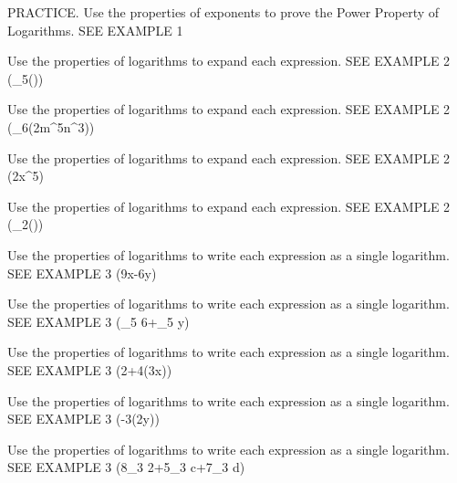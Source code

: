 \documentclass{article}
\newenvironment{practice}[2]{}{}        %
\newcommand{\answer}[1]{}               %
\begin{document}
\begin{practice}{13}{3}
PRACTICE. Use the properties of exponents to prove the Power Property of Logarithms. SEE EXAMPLE 1
\answer{Let (\log_b(m^n)=x).
(b^x=m^n)
((b^x)^{\frac{1}{n}}=(m^n)^{\frac{1}{n}})
(b^{\frac{x}{n}}=m)
(\frac{x}{n}=\log_b m)
(x=n\log_b m)
(\log_b(m^n)=n\log_b(m))}
\end{practice}
\begin{practice}{14}{1}
Use the properties of logarithms to expand each expression. SEE EXAMPLE 2
(\log_5())
\answer{(\log_5 2-\log_5 3)}
\end{practice}
\begin{practice}{15}{1}
Use the properties of logarithms to expand each expression. SEE EXAMPLE 2
(\log_6(2m^5n^3))
\answer{(\log_6 2+5\log_6 m+3\log_6 n)}
\end{practice}
\begin{practice}{16}{1}
Use the properties of logarithms to expand each expression. SEE EXAMPLE 2
(\ln2x^5)
\answer{(\ln2+5\ln x)}
\end{practice}
\begin{practice}{17}{1}
Use the properties of logarithms to expand each expression. SEE EXAMPLE 2
(\log_2())
\answer{(\log_2 x-\log_2 5-\log_2 y)}
\end{practice}
\begin{practice}{18}{1}
Use the properties of logarithms to write each expression as a single logarithm. SEE EXAMPLE 3
(9\ln x-6\ln y)
\answer{(\ln(\frac{x^9}{y^6}))}
\end{practice}
\begin{practice}{19}{1}
Use the properties of logarithms to write each expression as a single logarithm. SEE EXAMPLE 3
(\log_5 6+\log_5 y)
\answer{(\log_5(6y^{\frac{1}{2}}))}
\end{practice}
\begin{practice}{20}{1}
Use the properties of logarithms to write each expression as a single logarithm. SEE EXAMPLE 3
(2+4\log(3x))
\answer{(\log(8100x^4))}
\end{practice}
\begin{practice}{21}{1}
Use the properties of logarithms to write each expression as a single logarithm. SEE EXAMPLE 3
(-3\ln(2y))
\answer{(\ln\frac{3}{8y^3})}
\end{practice}
\begin{practice}{22}{1}
Use the properties of logarithms to write each expression as a single logarithm. SEE EXAMPLE 3
(8\log_3 2+5\log_3 c+7\log_3 d)
\answer{(\log_3(256c^5d^7))}
\end{practice}
\end{document}
